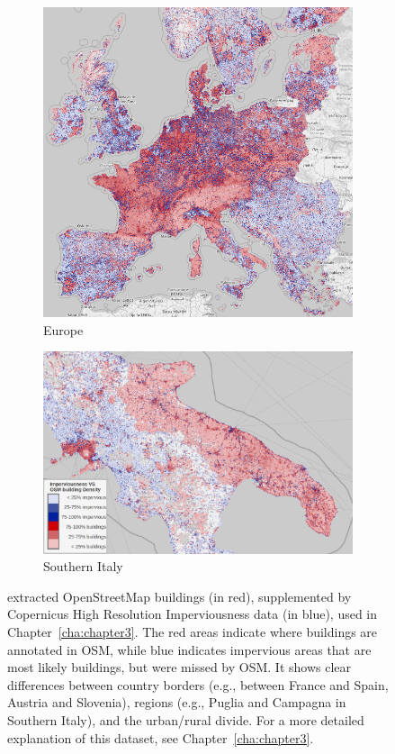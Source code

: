             \begin{figure}
            \begin{subfigure}[t]{0.33\textwidth}
            \centering
            \includegraphics[width=\linewidth,height=\linewidth]{figs_06/osm_impcop.png}
            \caption{Europe}
            \label{fig:osm_vs_cop_europe}
            \end{subfigure}
            \hfill
            \begin{subfigure}[t]{0.66\textwidth}
            \centering
            \includegraphics[width=\linewidth,height=0.5\linewidth]{figs_06/osm_vs_cop_italy.png}
            \caption{Southern Italy}
            \label{fig:osm_vs_cop_italy}
            \end{subfigure}
            \caption{extracted OpenStreetMap buildings (in red), supplemented by Copernicus High Resolution Imperviousness data (in blue), used in Chapter\@~\ref{cha:chapter3}. The red areas indicate where buildings are annotated in OSM, while blue indicates impervious areas that are most likely buildings, but were missed by OSM. It shows clear differences between country borders (e.g., between France and Spain, Austria and Slovenia), regions (e.g., Puglia and Campagna in Southern Italy), and the urban/rural divide. For a more detailed explanation of this dataset, see Chapter\@~\ref{cha:chapter3}.}
            \label{fig:osm_vs_cop_europe}
            \end{figure}
